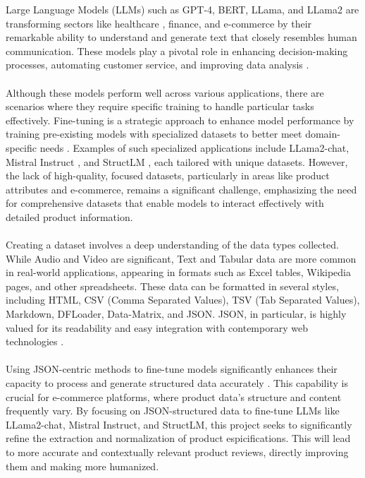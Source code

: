 Large Language Models (LLMs) such as GPT-4, BERT, LLama, and LLama2 are transforming sectors like healthcare \cite{he2023survey} \cite{REDDY2023101304}, finance, and e-commerce by their remarkable ability to understand and generate text that closely resembles human communication. These models play a pivotal role in enhancing decision-making processes, automating customer service, and improving data analysis \cite{Varshney_2024}.
\\\\
Although these models perform well across various applications, there are scenarios where they require specific training to handle particular tasks effectively. Fine-tuning is a strategic approach to enhance model performance by training pre-existing models with specialized datasets to better meet domain-specific needs \cite{Bergmann_2024}. Examples of such specialized applications include LLama2-chat\cite{touvron2023llama}, Mistral Instruct \cite{jiang2023mistral}, and StructLM \cite{zhuang2024structlm}, each tailored with unique datasets. However, the lack of high-quality, focused datasets, particularly in areas like product attributes and e-commerce, remains a significant challenge, emphasizing the need for comprehensive datasets that enable models to interact effectively with detailed product information.
\\\\
Creating a dataset involves a deep understanding of the data types collected. While Audio and Video are significant, Text and Tabular data are more common in real-world applications, appearing in formats such as Excel tables, Wikipedia pages, and other spreadsheets. These data can be formatted in several styles, including HTML, CSV (Comma Separated Values), TSV (Tab Separated Values), Markdown, DFLoader, Data-Matrix, and JSON. JSON, in particular, is highly valued for its readability and easy integration with contemporary web technologies \cite{singha2023tabular}.
\\\\
Using JSON-centric methods to fine-tune models significantly enhances their capacity to process and generate structured data accurately \cite{gao2024jsontuning}. This capability is crucial for e-commerce platforms, where product data's structure and content frequently vary. By focusing on JSON-structured data to fine-tune LLMs like LLama2-chat, Mistral Instruct, and StructLM, this project seeks to significantly refine the extraction and normalization of product espicifications. This will lead to more accurate and contextually relevant product reviews, directly improving them and making more humanized.
